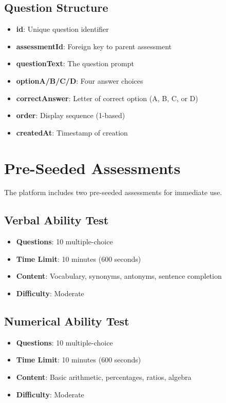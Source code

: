 \documentclass[12pt,a4paper]{report}
\begin{document}
\subsection{Question Structure}

\begin{itemize}
    \item \textbf{id}: Unique question identifier
    \item \textbf{assessmentId}: Foreign key to parent assessment
    \item \textbf{questionText}: The question prompt
    \item \textbf{optionA/B/C/D}: Four answer choices
    \item \textbf{correctAnswer}: Letter of correct option (A, B, C, or D)
    \item \textbf{order}: Display sequence (1-based)
    \item \textbf{createdAt}: Timestamp of creation
\end{itemize}

\section{Pre-Seeded Assessments}

The platform includes two pre-seeded assessments for immediate use.

\subsection{Verbal Ability Test}

\begin{itemize}
    \item \textbf{Questions}: 10 multiple-choice
    \item \textbf{Time Limit}: 10 minutes (600 seconds)
    \item \textbf{Content}: Vocabulary, synonyms, antonyms, sentence completion
    \item \textbf{Difficulty}: Moderate
\end{itemize}

\subsection{Numerical Ability Test}

\begin{itemize}
    \item \textbf{Questions}: 10 multiple-choice
    \item \textbf{Time Limit}: 10 minutes (600 seconds)
    \item \textbf{Content}: Basic arithmetic, percentages, ratios, algebra
    \item \textbf{Difficulty}: Moderate
\end{itemize}
\end{document}
